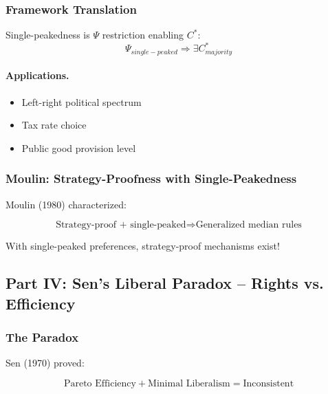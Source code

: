 \subsubsection{Framework Translation}

Single-peakedness is $\Psi$ restriction enabling $C^*$:
\begin{equation}
\Psi_{single-peaked} \Rightarrow \exists C^*_{majority}
\end{equation}

\paragraph{Applications.}
\begin{itemize}
    \item Left-right political spectrum
    \item Tax rate choice
    \item Public good provision level
\end{itemize}

\subsubsection{Moulin: Strategy-Proofness with Single-Peakedness}

Moulin (1980) characterized:

\begin{equation}
\boxed{
\text{Strategy-proof + single-peaked} \Rightarrow \text{Generalized median rules}
}
\label{eq:moulin}
\end{equation}

With single-peaked preferences, strategy-proof mechanisms exist!

\subsection{Part IV: Sen's Liberal Paradox – Rights vs. Efficiency}

\subsubsection{The Paradox}

Sen (1970) proved:

\begin{equation}
\boxed{
\text{Pareto Efficiency} + \text{Minimal Liberalism} = \text{Inconsistent}
}
\label{eq:liberal}
\end{equation}

